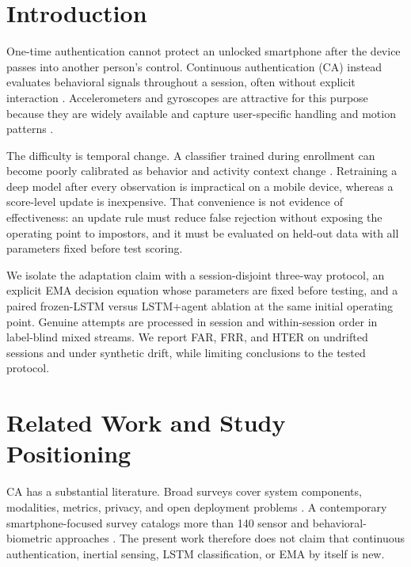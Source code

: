\documentclass[3p,times,procedia]{elsarticle}
\begin{document}
\section{Introduction}
\label{sec:intro}

One-time authentication cannot protect an unlocked smartphone after the device
passes into another person's control. Continuous authentication (CA) instead evaluates behavioral
signals throughout a session, often without explicit interaction
\cite{alzubaidi_authentication_2016,stylios_behavioral_2021}. Accelerometers and
gyroscopes are attractive for this purpose because they are widely available
and capture user-specific handling and motion patterns
\cite{sitova_hmog_2016,abuhamad_sensorbased_2021}.

The difficulty is temporal change. A classifier trained during enrollment can
become poorly calibrated as behavior and activity context change
\cite{verma_data-driven_2022}. Retraining a deep model after every observation
is impractical on a mobile device, whereas a score-level update is inexpensive.
That convenience is not evidence of effectiveness: an update rule must reduce
false rejection without exposing the operating point to impostors, and it must
be evaluated on held-out data with all parameters fixed before test scoring.

We isolate the adaptation claim with a session-disjoint three-way protocol, an
explicit EMA decision equation whose parameters are fixed before testing, and
a paired frozen-LSTM versus LSTM+agent ablation at the same initial operating
point. Genuine attempts are processed in session and within-session order in
label-blind mixed streams. We report FAR, FRR, and HTER on undrifted sessions and
under synthetic drift, while limiting conclusions to the tested protocol.

\section{Related Work and Study Positioning}
\label{sec:related}

CA has a substantial literature. Broad surveys cover system components,
modalities, metrics, privacy, and open deployment problems
\cite{stylios_behavioral_2021,gonzalezmanzano_leveraging_2019,
ayeswarya_survey_2019}. A contemporary smartphone-focused survey catalogs
more than 140 sensor and behavioral-biometric approaches
\cite{abuhamad_sensorbased_2021}. The present work therefore does not claim that
continuous authentication, inertial sensing, LSTM classification, or EMA by
itself is new.
\end{document}
